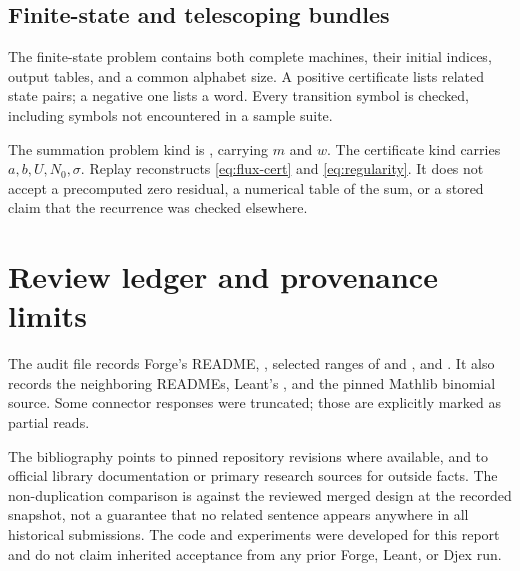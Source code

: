 \subsection{Finite-state and telescoping bundles}

The finite-state problem contains both complete machines, their initial indices, output tables, and a common alphabet size. A positive certificate lists related state pairs; a negative one lists a word. Every transition symbol is checked, including symbols not encountered in a sample suite.

The summation problem kind is , carrying $m$ and $w$. The certificate kind  carries $a,b,U,N_0,\sigma$. Replay reconstructs \eqref{eq:flux-cert} and \eqref{eq:regularity}. It does not accept a precomputed zero residual, a numerical table of the sum, or a stored claim that the recurrence was checked elsewhere.

\section{Review ledger and provenance limits}

The audit file records Forge's README, , selected ranges of  and , and . It also records the neighboring READMEs, Leant's , and the pinned Mathlib binomial source. Some connector responses were truncated; those are explicitly marked as partial reads.

The bibliography points to pinned repository revisions where available, and to official library documentation or primary research sources for outside facts. The non-duplication comparison is against the reviewed merged design at the recorded snapshot, not a guarantee that no related sentence appears anywhere in all historical submissions. The code and experiments were developed for this report and do not claim inherited acceptance from any prior Forge, Leant, or Djex run.
